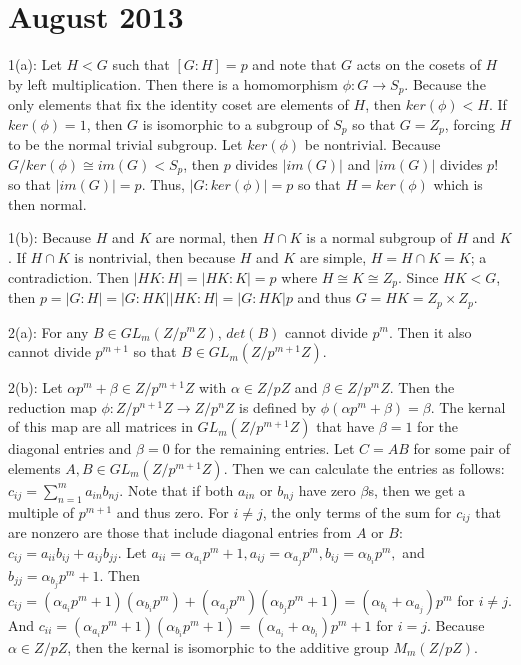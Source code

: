 \documentclass[12pt]{article}
\begin{document}
\section{August 2013}
1(a): Let $H < G$ such that $[G:H]=p$ and note that $G$ acts on the cosets of $H$ by left multiplication. Then there is a homomorphism $\phi:G \rightarrow S_p$. Because the only elements that fix the identity coset are elements of $H$, then $ker(\phi) < H$. If $ker(\phi)=1$, then $G$ is isomorphic to a subgroup of $S_p$ so that $G = Z_p$, forcing $H$ to be the normal trivial subgroup. Let $ker(\phi)$ be nontrivial. Because $G / ker(\phi) \cong im(G) < S_p$, then $p$ divides $|im(G)|$ and $|im(G)|$ divides $p!$ so that $|im(G)|=p$. Thus, $|G:ker(\phi)|=p$ so that $H=ker(\phi)$ which is then normal. \newline

1(b): Because $H$ and $K$ are normal, then $H \cap K$ is a normal subgroup of $H$ and $K$. If $H \cap K$ is nontrivial, then because $H$ and $K$ are simple, $H = H \cap K = K$; a contradiction. Then $|HK : H| = |HK : K| = p$ where $H \cong K \cong Z_p$. Since $HK < G$, then $p = |G:H| = |G:HK||HK:H|=|G:HK|p$ and thus $G=HK=Z_p \times Z_p$. \newline

2(a): For any $B \in GL_m(Z / p^m Z)$, $det(B)$ cannot divide $p^m$. Then it also cannot divide $p^{m+1}$ so that $B \in GL_m(Z / p^{m+1} Z)$. \newline

2(b): Let $\alpha p^m+\beta \in Z / p^{m+1}Z$ with $\alpha \in Z / p Z$ and $\beta \in Z / p^m Z$. Then the reduction map $\phi:Z/p^{n+1}Z \rightarrow Z/p^nZ$ is defined by $\phi(\alpha p^m+\beta)= \beta$. The kernal of this map are all matrices in $GL_m(Z / p^{m+1} Z)$ that have $\beta=1$ for the diagonal entries and $\beta=0$ for the remaining entries. Let $C=AB$ for some pair of elements $A,B \in GL_m(Z / p^{m+1} Z)$. Then we can calculate the entries as follows: $c_{ij}= \sum_{n=1}^m a_{in}b_{nj}$. Note that if both $a_{in}$ or $b_{nj}$ have zero $\beta$s, then we get a multiple of $p^{m+1}$ and thus zero. For $i \neq j$, the only terms of the sum for $c_{ij}$ that are nonzero are those that include diagonal entries from $A$ or $B$: $c_{ij}=a_{ii}b_{ij}+a_{ij}b_{jj}$. Let $a_{ii}=\alpha_{a_i}p^m+1, a_{ij}=\alpha_{a_j} p^m, b_{ij}=\alpha_{b_i} p^m,$ and $b_{jj}=\alpha_{b_j}p^m + 1$. Then $c_{ij}=(\alpha_{a_i}p^m+1)(\alpha_{b_i} p^m)+(\alpha_{a_j} p^m)(\alpha_{b_j} p^m + 1)=(\alpha_{b_i}+\alpha_{a_j}) p^m$ for $i \neq j$. And $c_{ii}=(\alpha_{a_i}p^m+1)(\alpha_{b_i}p^m+1)=(\alpha_{a_i}+\alpha_{b_i})p^m+1$ for $i = j$. Because $\alpha \in Z / pZ$, then the kernal is isomorphic to the additive group $M_m(Z/pZ)$. \newline
\end{document}
